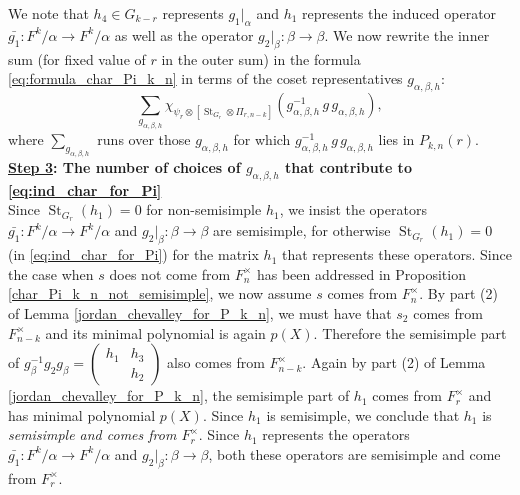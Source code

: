 \documentclass[reqno]{amsart}
\theoremstyle{definition}
\theoremstyle{remark}
\numberwithin{equation}{section}
\DeclareMathOperator{\St}{St}
\newcommand{\bbsm}{\left (\begin{smallmatrix}}      \newcommand{\besm}{\end{smallmatrix}\right )}
\begin{document}
We note that  $h_4 \in G_{k-r}$ represents $g_1|_\alpha$  and $h_1$ represents the induced operator  $\bar{g_1}: F^k/\alpha \to F^k/\alpha$ as well as the operator  $g_2|_\beta: \beta \to \beta$. We now rewrite the inner sum (for fixed value of $r$ in the outer sum) in the formula \eqref{eq:formula_char_Pi_k_n} in terms of the coset representatives $g_{\alpha, \beta, h}$:
\begin{equation} \label{eq:ind_char_for_Pi} \sum_{g_{\alpha, \beta,h}} \chi_{\psi_r \otimes [\St_{G_r} \otimes \Pi_{r,n-k}]} (g_{\alpha,\beta, h}^{-1} \,g \,g_{\alpha,\beta, h}),\end{equation}
where $\sum_{g_{\alpha, \beta, h}}$ runs over those $g_{\alpha,\beta, h}$ for which $g_{\alpha,\beta, h}^{-1} \,g \,g_{\alpha,\beta, h}$ lies in $P_{k,n}(r)$. \\







\noindent\textbf{\underline{Step 3}: The number of choices of $g_{\alpha, \beta,h}$  that contribute to \eqref{eq:ind_char_for_Pi}}\hfill \\

Since $\St_{G_r}(h_1)=0$ for non-semisimple $h_1$, we  insist the operators $\bar{g_1}: F^k/\alpha \to F^k/\alpha$ and  $g_2|_\beta: \beta \to \beta$ are semisimple, for otherwise $\St_{G_r}(h_1)=0$ (in \eqref{eq:ind_char_for_Pi}) for the matrix $h_1$ that represents these operators.  Since the case when $s$ does not come from $F_n^\times$ has been addressed in Proposition \ref{char_Pi_k_n_not_semisimple}, we now assume $s$ comes from $F_n^\times$. By part (2) of Lemma \ref{jordan_chevalley_for_P_k_n}, we must have that $s_2$ comes from $F_{n-k}^\times$ and its minimal polynomial is again $p(X)$. Therefore the semisimple part of  $g_\beta^{-1} g_2 g_\beta=\bbsm h_1 &h_3\\ &h_2  \besm$ also comes from $F_{n-k}^\times$. Again by part (2) of Lemma \ref{jordan_chevalley_for_P_k_n}, the semisimple part of $h_1$ comes from $F_r^\times$ and has minimal polynomial $p(X)$. Since $h_1$  is semisimple, we conclude that $h_1$ is \emph{semisimple  and comes from $F_r^\times$}. 
 Since $h_1$ represents the operators  $\bar{g_1}: F^k/\alpha \to F^k/\alpha$ and  $g_2|_\beta: \beta \to \beta$, both these operators are semisimple and  come from $F_r^\times$. \\
\end{document}
